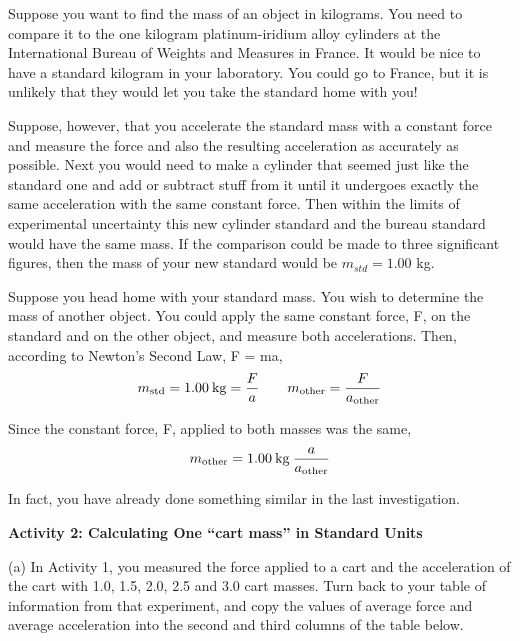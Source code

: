 Suppose you want to find the mass of an object in kilograms. You need to compare
it to the one kilogram platinum-iridium alloy cylinders at the International
Bureau of Weights and Measures in France. It would be nice to have a standard
kilogram in your laboratory. You could go to France, but it is unlikely that
they would let you take the standard home with you!

Suppose, however, that you accelerate the standard mass with a constant force
and measure the force and also the resulting acceleration as accurately as possible.
Next you would need to make a cylinder that seemed just like the standard one
and add or subtract stuff from it until it undergoes exactly the same acceleration
with the same constant force. Then within the limits of experimental uncertainty
this new cylinder standard and the bureau standard would have the same mass.
If the comparison could be made to three significant figures, then the mass
of your new standard would be \( m_{std}  = 1.00\) kg.

Suppose you head home with your standard mass. You wish to determine the mass
of another object. You could apply the same constant force, F, on the standard
and on the other object, and measure both accelerations. Then, according to
Newton's Second Law, F = ma,
\[
m_{\rm std}=1.00\: {\rm kg}=\frac{F}{a}\qquad m_{\rm other}=
\frac{F}{a_{\rm other}}\]

\vspace{-0.2cm}
Since the constant force, F, applied to both masses was the same,
\[
m_{\rm other}=1.00\: {\rm kg}\: \frac{a}{a_{\rm other}}\]


In fact, you have already done something similar in the last investigation. 

\pagebreak[2]
\textbf{Activity 2: Calculating One ``cart mass'' in Standard
Units }

(a) In Activity 1, you measured the force applied to a cart and the acceleration
of the cart with 1.0, 1.5, 2.0, 2.5 and 3.0 cart masses. Turn back to your table
of information from that experiment, and copy the values of average force and
average acceleration into the second and third columns of the table below.

